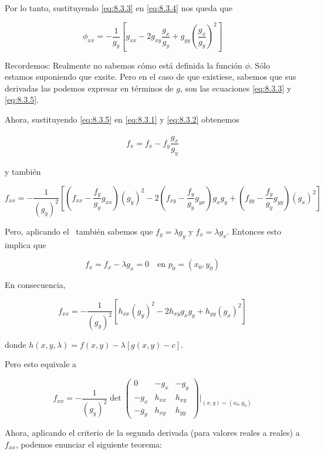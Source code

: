 Por lo tanto, sustituyendo \ref{eq:8.3.3} en \ref{eq:8.3.4} nos queda que

\begin{equation}\label{eq:8.3.5}
    \phi_{xx} = -\frac{1}{g_y} \left[ g_{xx} - 2g_{xy}\frac{g_x}{g_y} + g_{yy} \left( \frac{g_x}{g_y} \right)^2 \right]
\end{equation}

Recordemos: Realmente no sabemos cómo está definida la función $\phi$. Sólo estamos suponiendo que exsite. Pero en el caso de que existiese, sabemos que sus derivadas las podemos expresar en términos de $g$, son las ecuaciones \ref{eq:8.3.3} y \ref{eq:8.3.5}.

Ahora, sustituyendo \ref{eq:8.3.5} en \ref{eq:8.3.1} y \ref{eq:8.3.2} obtenemos

\begin{gather*}
    f_x = f_x - f_y\dfrac{g_x}{g_y}
\end{gather*}

\noindent y también

\[
f_{xx} = -\frac{1}{(g_y)^2} \left[ \left( f_{xx} - \frac{f_y}{g_y}g_{xx} \right)(g_y)^2 - 2\left( f_{xy} - \frac{f_y}{g_y}g_{yx} \right)g_xg_y + \left(f_{yy} - \frac{f_y}{g_y}g_{yy} \right)(g_x)^2 \right]
\]

Pero, aplicando el \Lagrange~también sabemos que $f_y = \lambda g_y$ y $f_x = \lambda g_x$. Entonces esto implica que

\[
f_x = f_x - \lambda g_x = 0 \quad \text{en $p_0 = (x_0, y_0)$}
\]

En consecuencia,

\[
f_{xx} = -\frac{1}{(g_y)^2}\left[ h_{xx}(g_y)^2 - 2h_{xy}g_xg_y + h_{yy}(g_x)^2 \right]
\]

\noindent donde $h(x,y,\lambda) = f(x,y) - \lambda \left[g(x,y) - c\right]$.

Pero esto equivale a

\[
f_{xx} = -\frac{1}{(g_y)^2} \det
    \begin{pmatrix}
        0    & -g_x   & -g_y   \\
        -g_x & h_{xx} & h_{xy} \\
        -g_y & h_{xy} & h_{yy}
    \end{pmatrix}
    \Biggr\rvert_{(x,y) = (x_0,y_0)}
\]

Ahora, aplicando el criterio de la segunda derivada (para valores reales a reales) a $f_{xx}$, podemos enunciar el siguiente teorema:

